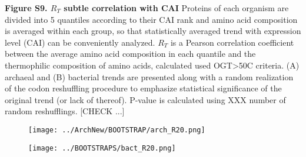 \documentclass{report}
\begin{document}

{\bf  Figure S9. $R_T$ subtle correlation with CAI} Proteins of each organism are divided into 5 quantiles according to their CAI rank and amino acid composition is averaged within each group, so that statistically averaged trend with expression level (CAI) can be conveniently analyzed. $R_T$ is a Pearson correlation coefficient between the average amino acid composition in each quantile and the thermophilic composition of amino acids, calculated used OGT>50C criteria. (A) archaeal and (B) bacterial trends are presented along with a random realization of the codon reshuffling procedure to emphasize statistical significance of the original trend (or lack of thereof). P-value is calculated using XXX number of random reshufflings. [CHECK ...]



\begin{figure}[b!]
	\centering
	\texttt{[image: ../ArchNew/BOOTSTRAP/arch\_R20.png]}
\end{figure}


\begin{figure}[b!]
	\centering
	\texttt{[image: ../BOOTSTRAPS/bact\_R20.png]}
\end{figure}
\end{document}
